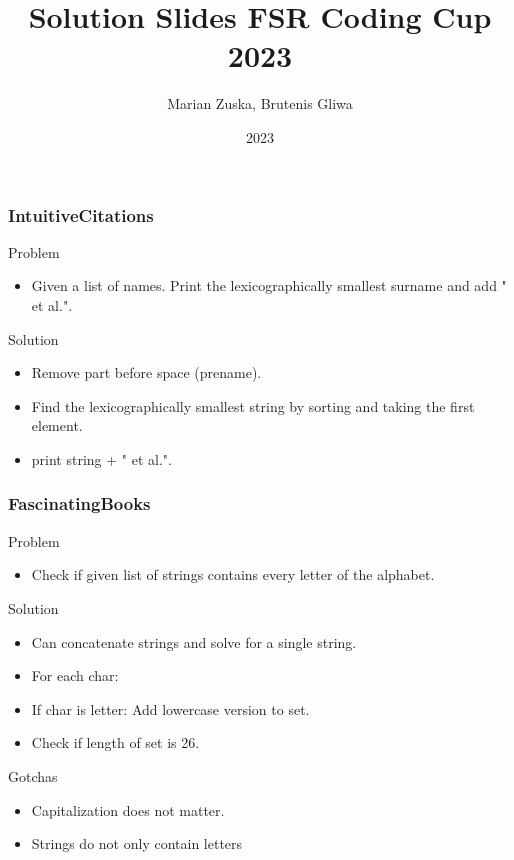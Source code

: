 \documentclass{beamer}
\title{Solution Slides FSR Coding Cup 2023}
\author{Marian Zuska, Brutenis Gliwa}
\institute{Universität Rostock}
\date{2023}
\begin{document}
\frame{\titlepage}

\begin{frame}
    \frametitle{IntuitiveCitations}
    \begin{block}{Problem}
        \begin{itemize}
            \item Given a list of names. Print the lexicographically smallest surname and add " et al.".
        \end{itemize}
    \end{block}
    \begin{block}{Solution}
        \begin{itemize}
            \item Remove part before space (prename).
            \item Find the lexicographically smallest string by sorting and taking the first element.
            \item print string + " et al.".
        \end{itemize}
    \end{block}
\end{frame}

\begin{frame}
    \frametitle{FascinatingBooks}
    \begin{block}{Problem}
        \begin{itemize}
            \item Check if given list of strings contains every letter of the alphabet.
        \end{itemize}
    \end{block}
    \begin{block}{Solution}
        \begin{itemize}
            \item Can concatenate strings and solve for a single string.
            \item For each char:
            \item If char is letter: Add lowercase version to set.
            \item Check if length of set is 26.
        \end{itemize}
    \end{block}
    \begin{block}{Gotchas}
        \begin{itemize}
            \item Capitalization does not matter.
            \item Strings do not only contain letters
        \end{itemize}
    \end{block}
\end{frame}
\end{document}
